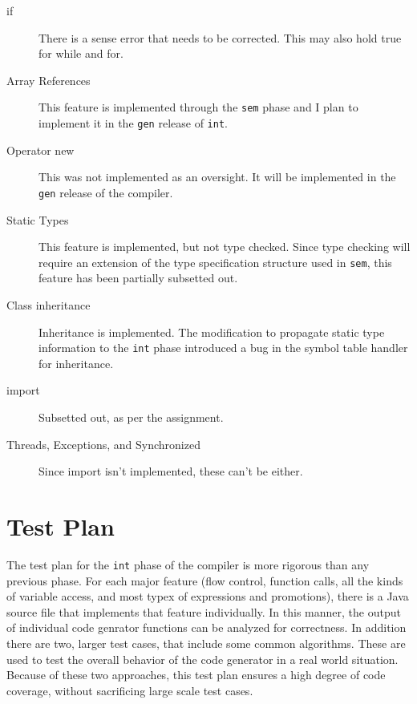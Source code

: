 \documentclass{article}[1994/05/24]
\begin{document}
\begin{description}

\item[if]

	There is a sense error that needs to be corrected.
	This may also hold true for while and for.

\item[Array References]

	This feature is implemented through the \verb|sem|
	phase and I plan to implement it in the \verb|gen|
	release of \verb|int|.

\item[Operator new]

	This was not implemented as an oversight.  It will be
	implemented in the \verb|gen| release of the compiler.

\item[Static Types]

	This feature is implemented, but not type checked.
	Since type checking will require an extension of the
	type specification structure used in \verb|sem|, this
	feature has been partially subsetted out.

\item[Class inheritance]

	Inheritance is implemented. The modification to propagate
	static type information to the \verb|int| phase introduced
	a bug in the symbol table handler for inheritance.

\item[import]

	Subsetted out, as per the assignment.

\item[Threads, Exceptions, and Synchronized]

	Since import isn't implemented, these can't be
	either.

\end{description}

\section{Test Plan}

	The test plan for the \verb|int| phase of the compiler
is more rigorous than any previous phase. For each major feature
(flow control, function calls, all the kinds of variable access,
and most typex of expressions and promotions), there is a Java
source file that implements that feature individually. In this
manner, the output of individual code genrator functions can
be analyzed for correctness.  In addition there are two, larger
test cases, that include some common algorithms. These are used
to test the overall behavior of the code generator in a real world
situation. Because of these two approaches, this test plan ensures
a high degree of code coverage, without sacrificing large scale test
cases.
\end{document}
